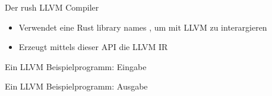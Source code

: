 \begin{frame}{Der rush LLVM Compiler}
	\begin{itemize}
		\item Verwendet eine Rust library names , um mit LLVM zu interargieren
		\item Erzeugt mittels dieser API die LLVM IR
	\end{itemize}
\end{frame}

\begin{frame}{Ein LLVM Beispielprogramm: Eingabe}
\end{frame}

\begin{frame}{Ein LLVM Beispielprogramm: Ausgabe}
\end{frame}
